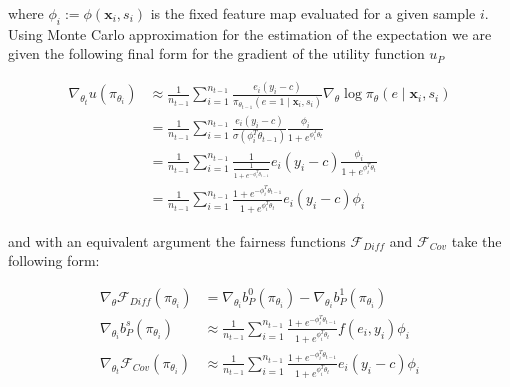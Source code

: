 \documentclass[
	a4paper,
	11pt
	]{article}
\begin{document}
where $\phi_i := \phi(\boldsymbol{x}_i, s_i)$ is the fixed feature map evaluated for a given sample $i$. Using Monte Carlo approximation for the estimation of the expectation we are given the following final form for the gradient of the utility function $u_P$

\begin{align*}
    \nabla_{\theta_t}u(\pi_{\theta_i}) &\approx \frac{1}{n_{t-1}} \sum_{i=1}^{n_{t-1}} \frac{e_i(y_i - c)}{\pi_{\theta_{t-1}}(e = 1 \mid \boldsymbol{x}_i, s_i)}\nabla_{\theta} \log \pi_\theta(e \mid \boldsymbol{x}_i, s_i) \\
    &= \frac{1}{n_{t-1}} \sum_{i=1}^{n_{t-1}} \frac{e_i(y_i - c)}{\sigma(\phi_i^T\theta_{t-1})} \frac{\phi_i}{1 + e^{\phi_i^T\theta_t}} \\
    &= \frac{1}{n_{t-1}} \sum_{i=1}^{n_{t-1}} \frac{1}{\frac{1}{1 + e^{-\phi_i^T\theta_{t-1}}}} e_i(y_i - c) \frac{\phi_i}{1 + e^{\phi_i^T\theta_t}} \\
    &= \frac{1}{n_{t-1}} \sum_{i=1}^{n_{t-1}} \frac{1 + e^{-\phi_i^T\theta_{t-1}}}{1 + e^{\phi_i^T\theta_t}} e_i(y_i - c)\phi_i 
\end{align*}

and with an equivalent argument the fairness functions $\mathcal{F}_{Diff}$ and $\mathcal{F}_{Cov}$ take the following form:

\begin{align*}
    \nabla_{\theta}\mathcal{F}_{Diff}(\pi_{\theta_i}) &= \nabla_{\theta_i}b_P^0(\pi_{\theta_i}) - \nabla_{\theta_i}b_P^1(\pi_{\theta_i}) \\
    \nabla_{\theta_i}b_P^s(\pi_{\theta_i}) &\approx \frac{1}{n_{t-1}} \sum_{i=1}^{n_{t-1}} \frac{1 + e^{-\phi_i^T\theta_{t-1}}}{1 + e^{\phi_i^T\theta_t}} f(e_i, y_i)\phi_i \\
    \nabla_{\theta_t}\mathcal{F}_{Cov}(\pi_{\theta_i}) &\approx \frac{1}{n_{t-1}} \sum_{i=1}^{n_{t-1}} \frac{1 + e^{-\phi_i^T\theta_{t-1}}}{1 + e^{\phi_i^T\theta_t}} e_i(y_i - c)\phi_i 
\end{align*}


    
    

 

\end{document}
